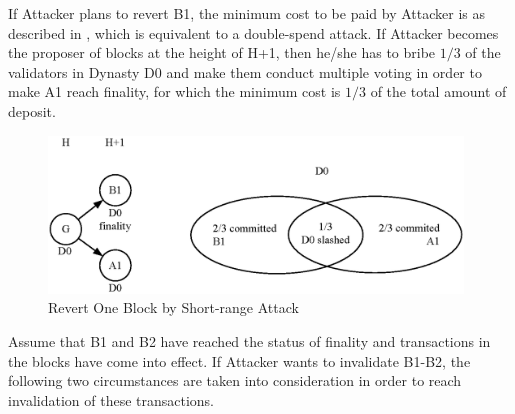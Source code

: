 
If Attacker plans to revert B1, the minimum cost to be paid by Attacker is as described in , which is equivalent to a double-spend attack. If Attacker becomes the proposer of blocks at the height of H+1, then he/she has to bribe $1/3$ of the validators in Dynasty D0 and make them conduct multiple voting in order to make A1 reach finality, for which the minimum cost is $1/3$ of the total amount of deposit.


\begin{figure}[h]
\centering
\includegraphics[width=11cm]{./figs/revert1}
\caption{Revert One Block by Short-range Attack}
\label{fig:revert1}
\end{figure}

Assume that B1 and B2 have reached the status of finality and transactions in the blocks have come into effect. If Attacker wants to invalidate B1-B2, the following two circumstances are taken into consideration in order to reach invalidation of these transactions. 

